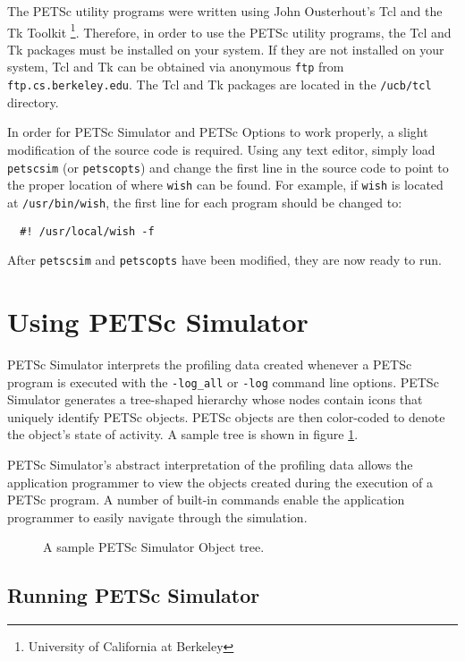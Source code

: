 The PETSc utility programs were written using John Ousterhout's Tcl
and the Tk Toolkit \footnote{University of California at Berkeley}.
Therefore, in order to use the PETSc utility programs, the Tcl and Tk
packages must be installed on your system.  If they are not installed
on your system, Tcl and Tk can be obtained via anonymous {\tt ftp}
from {\tt ftp.cs.berkeley.edu}.  The Tcl and Tk packages are located
in the {\tt /ucb/tcl} directory.

In order for PETSc Simulator and PETSc Options to work properly, a
slight modification of the source code is required.  Using any text
editor, simply load {\tt petscsim} (or {\tt petscopts}) and change the
first line in the source code to point to the proper location of where
{\tt wish} can be found.  For example, if {\tt wish} is located at
{\tt /usr/bin/wish}, the first line for each program should be changed
to:
\begin{verbatim}
  #! /usr/local/wish -f
\end{verbatim}
After {\tt petscsim} and {\tt petscopts} have been modified, they are
now ready to run.

\newpage
\section{Using PETSc Simulator}

PETSc Simulator interprets the profiling data created whenever a PETSc
program is executed with the {\tt -log\_all} or {\tt -log} command
line options.  PETSc Simulator generates a tree-shaped hierarchy whose
nodes contain icons that uniquely identify PETSc objects.  PETSc
objects are then color-coded to denote the object's state of activity.
A sample tree is shown in figure \ref{example tree}.

PETSc Simulator's abstract interpretation of the profiling data allows
the application programmer to view the objects created during the
execution of a PETSc program.  A number of built-in commands
enable the application programmer to easily navigate through the
simulation.

\begin{figure}
\centerline{}
\caption{A sample PETSc Simulator Object tree.}
\label{example tree}
\end{figure}

\subsection{Running PETSc Simulator}

